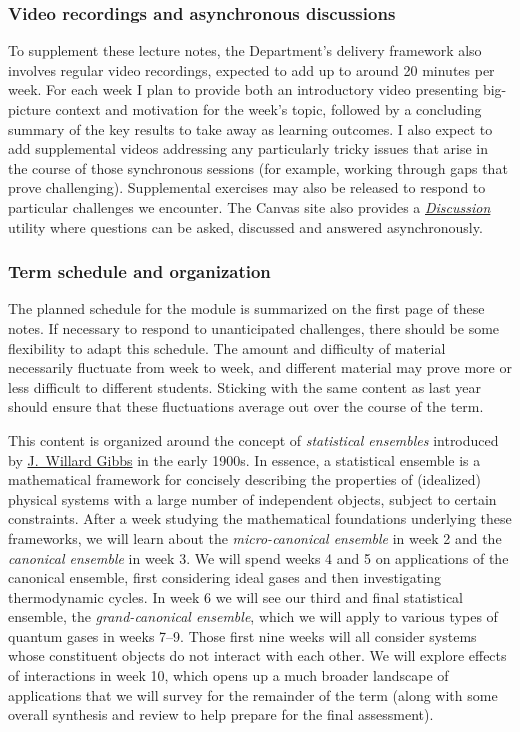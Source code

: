 \subsubsection*{Video recordings and asynchronous discussions}
To supplement these lecture notes, the Department's delivery framework also involves regular video recordings, expected to add up to around 20 minutes per week.
For each week I plan to provide both an introductory video presenting big-picture context and motivation for the week's topic, followed by a concluding summary of the key results to take away as learning outcomes.
I also expect to add supplemental videos addressing any particularly tricky issues that arise in the course of those synchronous sessions (for example, working through gaps that prove challenging).
Supplemental exercises may also be released to respond to particular challenges we encounter.
The Canvas site also provides a \textit{\href{https://liverpool.instructure.com/courses/19478/discussion_topics}{Discussion}} utility where questions can be asked, discussed and answered asynchronously.

\subsubsection*{Term schedule and organization}
The planned schedule for the module is summarized on the first page of these notes.
If necessary to respond to unanticipated challenges, there should be some flexibility to adapt this schedule.
The amount and difficulty of material necessarily fluctuate from week to week, and different material may prove more or less difficult to different students.
Sticking with the same content as last year should ensure that these fluctuations average out over the course of the term.

This content is organized around the concept of \textit{statistical ensembles} introduced by \href{https://en.wikipedia.org/wiki/Josiah_Willard_Gibbs}{J.\ Willard Gibbs} in the early 1900s.
In essence, a statistical ensemble is a mathematical framework for concisely describing the properties of (idealized) physical systems with a large number of independent objects, subject to certain constraints.
After a week studying the mathematical foundations underlying these frameworks, we will learn about the \textit{micro-canonical ensemble} in week 2 and the \textit{canonical ensemble} in week 3.
We will spend weeks 4 and 5 on applications of the canonical ensemble, first considering ideal gases and then investigating thermodynamic cycles.
In week 6 we will see our third and final statistical ensemble, the \textit{grand-canonical ensemble}, which we will apply to various types of quantum gases in weeks 7--9.
Those first nine weeks will all consider systems whose constituent objects do not interact with each other.
We will explore effects of interactions in week 10, which opens up a much broader landscape of applications that we will survey for the remainder of the term (along with some overall synthesis and review to help prepare for the final assessment).

